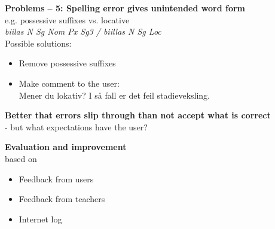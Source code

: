 \documentclass[landscape,norsk,11pt]{seminar}
\begin{document}
\begin{slide}
\newslide
\textbf{Problems -- 5: Spelling error gives unintended word form} \\
e.g. possessive suffixes vs. locative \\
\textit{biilas N Sg Nom Px Sg3 / biillas N Sg Loc} \\

Possible solutions:
\begin{itemize}
\item Remove possessive suffixes
\item Make comment to the user: \\
Mener du lokativ? I så fall er det feil stadieveksling.
\end{itemize}







\newslide
\textbf{Better that errors slip through than not accept what is correct} \\

- but what expectations have the user?

\newslide
\textbf{Evaluation and improvement}\\
based on
\begin{itemize}
\item{Feedback from users}
\item{Feedback from teachers}
\item{Internet log}
\end{itemize}


\end{slide}
\end{document}

